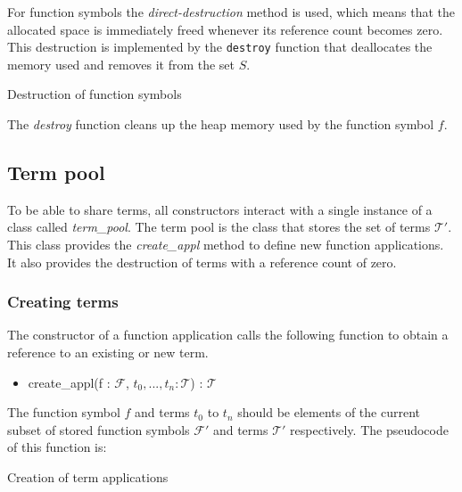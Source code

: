 \documentclass[10pt,a4paper]{article}
\newcommand{\functionsymbols}{\mathcal{F}}
\newcommand{\terms}{\mathcal{T}}
\begin{document}
For function symbols the \emph{direct-destruction} method is used, which means that the allocated space is immediately freed whenever its reference count becomes zero.
This destruction is implemented by the \verb|destroy| function that deallocates the memory used and removes it from the set $S$.

\begin{algorithm}[H]
 \caption{Destruction of function symbols}\label{alg:destroy_function_symbol}
 \begin{algorithmic}[1]
  \State {$\functionsymbols' \gets \functionsymbols' \setminus \{f\}$}
  \EndProcedure
\end{algorithmic}
\end{algorithm}

\noindent The \emph{destroy} function cleans up the heap memory used by the function symbol $f$.

\subsection{Term pool}
To be able to share terms, all constructors interact with a single instance of a class called \emph{term\_pool}.
The term pool is the class that stores the set of terms $\terms'$.
This class provides the \emph{create\_appl} method to define new function applications.
It also provides the destruction of terms with a reference count of zero. 

\subsubsection{Creating terms}

The constructor of a function application calls the following function to obtain a reference to an existing or new term.

\begin{itemize}    
	\item create\_appl(f : $\functionsymbols$, $t_0, ..., t_n : \terms$) : $\terms$
\end{itemize}

\noindent The function symbol $f$ and terms $t_0$ to $t_n$ should be elements of the current subset of stored function symbols $\functionsymbols'$ and terms $\terms'$ respectively.
The pseudocode of this function is:

\begin{algorithm}[H]
 \caption{Creation of term applications}\label{alg:creation}
 \begin{algorithmic}[1]
  \If {$\text{term\_appl}(f, t_0,...t_n) \in \terms'$}
  \EndIf
  
  
  \EndIf
  
  \State {$\terms' \gets \terms' \cup \{t\}$}
  \EndProcedure
\end{algorithmic}
\end{algorithm}
\end{document}
